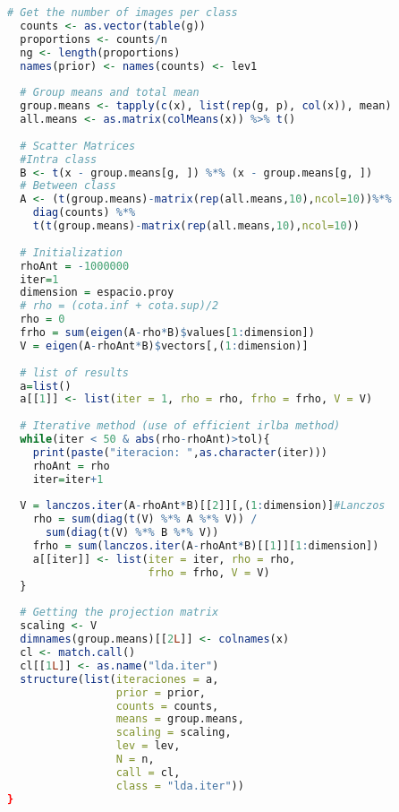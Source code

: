 \begin{lstlisting}[language=R, basicstyle=\small]
  # Get the number of images per class
  counts <- as.vector(table(g))
  proportions <- counts/n
  ng <- length(proportions)
  names(prior) <- names(counts) <- lev1
  
  # Group means and total mean
  group.means <- tapply(c(x), list(rep(g, p), col(x)), mean)
  all.means <- as.matrix(colMeans(x)) %>% t()
  
  # Scatter Matrices 
  #Intra class
  B <- t(x - group.means[g, ]) %*% (x - group.means[g, ]) 
  # Between class
  A <- (t(group.means)-matrix(rep(all.means,10),ncol=10))%*% 
    diag(counts) %*% 
    t(t(group.means)-matrix(rep(all.means,10),ncol=10)) 
  
  # Initialization
  rhoAnt = -1000000
  iter=1
  dimension = espacio.proy
  # rho = (cota.inf + cota.sup)/2
  rho = 0
  frho = sum(eigen(A-rho*B)$values[1:dimension])
  V = eigen(A-rhoAnt*B)$vectors[,(1:dimension)]
  
  # list of results
  a=list()
  a[[1]] <- list(iter = 1, rho = rho, frho = frho, V = V) 
  
  # Iterative method (use of efficient irlba method)
  while(iter < 50 & abs(rho-rhoAnt)>tol){
    print(paste("iteracion: ",as.character(iter)))
    rhoAnt = rho
    iter=iter+1  
    
  V = lanczos.iter(A-rhoAnt*B)[[2]][,(1:dimension)]#Lanczos
    rho = sum(diag(t(V) %*% A %*% V)) /
      sum(diag(t(V) %*% B %*% V))
    frho = sum(lanczos.iter(A-rhoAnt*B)[[1]][1:dimension])
    a[[iter]] <- list(iter = iter, rho = rho,
                      frho = frho, V = V)
  }
  
  # Getting the projection matrix
  scaling <- V
  dimnames(group.means)[[2L]] <- colnames(x)
  cl <- match.call()
  cl[[1L]] <- as.name("lda.iter")
  structure(list(iteraciones = a, 
                 prior = prior, 
                 counts = counts, 
                 means = group.means, 
                 scaling = scaling, 
                 lev = lev, 
                 N = n, 
                 call = cl, 
                 class = "lda.iter"))
}
\end{lstlisting}

